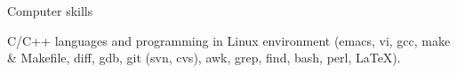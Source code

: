 \begin{rubric}{Computer skills}

\entry*[4 years]
C/C++ languages and programming in Linux environment (emacs, vi, gcc, make 
\& Makefile, diff, gdb, git (svn, cvs), awk, grep, find, bash, 
perl, 
\LaTeX).



\end{rubric}
